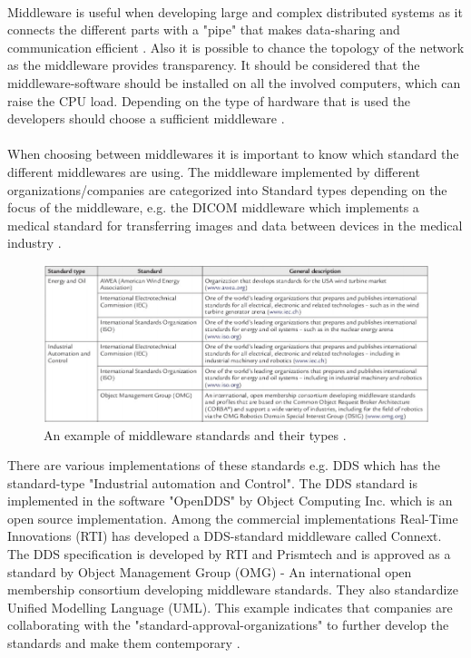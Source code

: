 \documentclass[Main]{subfiles}
\begin{document}
\\
Middleware is useful when developing large and complex distributed systems as it connects the different parts with a "pipe" that makes data-sharing and communication efficient \cite{DDS-slides} \cite[p. 68]{Coulouris}. Also it is possible to chance the topology of the network as the middleware provides transparency. It should be considered that the middleware-software should be installed on all the involved computers, which can raise the CPU load. Depending on the type of hardware that is used the developers should choose a sufficient middleware \cite{DDS-slides}.
\\
\\
When choosing between middlewares it is important to know which standard the different middlewares are using. The middleware implemented by different organizations/companies are categorized into Standard types depending on the focus of the middleware, e.g. the DICOM middleware which implements a medical standard for transferring images and data between devices in the medical industry \cite{DDS_slides}.\\

\begin{figure}[H]
\centering
\includegraphics[scale=0.6]{Figure/Standards.png}
\caption{An example of middleware standards and their types \cite{DDS-slides}.}
\end{figure}

There are various implementations of these standards e.g. DDS which has the standard-type "Industrial automation and Control". The DDS standard is implemented in the software "OpenDDS" by Object Computing Inc. which is an open source implementation. Among the commercial implementations Real-Time Innovations (RTI) has developed a DDS-standard middleware called Connext.\\The DDS specification is developed by RTI and Prismtech and is approved as a standard by Object Management Group (OMG) - An international open membership consortium developing middleware standards. They also standardize Unified Modelling Language (UML). This example indicates that companies are collaborating with the "standard-approval-organizations" to further develop the standards and make them contemporary \cite{DDS-slides}.\\
\end{document}
